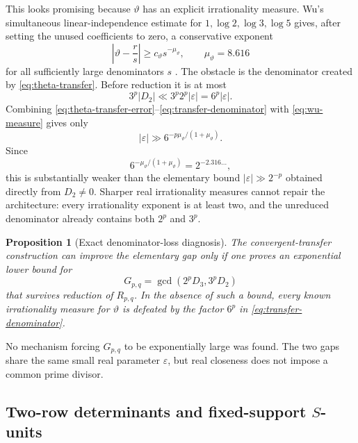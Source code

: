 \documentclass[11pt,oneside]{article}
\newtheorem{proposition}[theorem]{Proposition}
\theoremstyle{definition}
\theoremstyle{remark}
\begin{document}
This looks promising because $\vartheta$ has an explicit irrationality measure.  Wu's
simultaneous linear-independence estimate for $1,\log2,\log3,\log5$ gives, after setting the
unused coefficients to zero, a conservative exponent
\begin{equation}\label{eq:wu-measure}
 \left|\vartheta-\frac rs\right|
 \ge c_\vartheta s^{-\mu_\vartheta},
 \qquad \mu_\vartheta=8.616
\end{equation}
for all sufficiently large denominators $s$ \cite{Wu2003}.  The obstacle is the denominator
created by \eqref{eq:theta-transfer}.  Before reduction it is at most
\begin{equation}\label{eq:transfer-denominator}
 3^p|D_2|
 \ll 3^p2^p|\varepsilon|
 =6^p|\varepsilon|.
\end{equation}
Combining \eqref{eq:theta-transfer-error}--\eqref{eq:transfer-denominator} with
\eqref{eq:wu-measure} gives only
\begin{equation}\label{eq:transfer-lower}
 |\varepsilon|
 \gg 6^{-p\mu_\vartheta/(1+\mu_\vartheta)}.
\end{equation}
Since
\[
 6^{-\mu_\vartheta/(1+\mu_\vartheta)}
 =2^{-2.316\ldots},
\]
this is substantially weaker than the elementary bound
$|\varepsilon|\gg2^{-p}$ obtained directly from $D_2\ne0$.  Sharper real irrationality
measures cannot repair the architecture: every irrationality exponent is at least two, and
the unreduced denominator already contains both $2^p$ and $3^p$.

\begin{proposition}[Exact denominator-loss diagnosis]\label{prop:transfer-loss}
The convergent-transfer construction can improve the elementary gap only if one proves an
exponential lower bound for
\begin{equation}\label{eq:transfer-gcd}
 G_{p,q}=\gcd(2^pD_3,3^pD_2)
\end{equation}
that survives reduction of $R_{p,q}$.  In the absence of such a bound, every known
irrationality measure for $\vartheta$ is defeated by the factor $6^p$ in
\eqref{eq:transfer-denominator}.
\end{proposition}

No mechanism forcing $G_{p,q}$ to be exponentially large was found.  The two gaps share the
same small real parameter $\varepsilon$, but real closeness does not impose a common prime
divisor.

\subsection{Two-row determinants and fixed-support \texorpdfstring{$S$}{S}-units}
\end{document}
